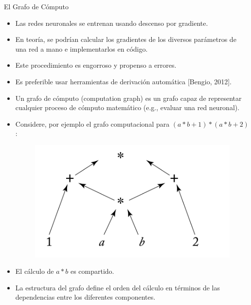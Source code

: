 \documentclass[handout]{beamer}
\begin{document}
\begin{frame}{El Grafo de Cómputo}
\begin{scriptsize}
\begin{itemize}
\item Las redes neuronales se entrenan usando descenso por gradiente. 
\item En teoría, se podrían calcular los gradientes de los diversos parámetros de una red a mano e implementarlos en código.

\item Este procedimiento es engorroso y propenso a errores.

\item Es preferible usar herramientas de derivación automática [Bengio, 2012].

\item Un grafo de cómputo (computation graph) es un grafo capaz de representar cualquier proceso de cómputo matemático (e.g., evaluar una red neuronal).

\item Considere, por ejemplo el grafo computacional para $(a*b+1)*(a*b+2)$:

\begin{figure}[htb]
	\centering
	 \includegraphics[scale=0.25]{imagenes/compGraph.png}
\end{figure}

\item El cálculo de $a*b$ es compartido.

\item La estructura del grafo define el orden del cálculo en términos de las dependencias entre los diferentes componentes.

\end{itemize}
\end{scriptsize}
\end{frame}
\end{document}

